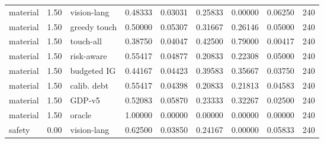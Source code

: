 \documentclass{article}
\begin{document}
\begin{center}
\begin{longtable}{lllllllll}
material & 1.50 & vision-lang & 0.48333 & 0.03031 & 0.25833 & 0.00000 & 0.06250 & 240 \\
material & 1.50 & greedy touch & 0.50000 & 0.05307 & 0.31667 & 0.26146 & 0.05000 & 240 \\
material & 1.50 & touch-all & 0.38750 & 0.04047 & 0.42500 & 0.79000 & 0.00417 & 240 \\
material & 1.50 & risk-aware & 0.55417 & 0.04877 & 0.20833 & 0.22308 & 0.05000 & 240 \\
material & 1.50 & budgeted IG & 0.44167 & 0.04423 & 0.39583 & 0.35667 & 0.03750 & 240 \\
material & 1.50 & calib. debt & 0.55417 & 0.04398 & 0.20833 & 0.21813 & 0.04583 & 240 \\
material & 1.50 & GDP-v5 & 0.52083 & 0.05870 & 0.23333 & 0.32267 & 0.02500 & 240 \\
material & 1.50 & oracle & 1.00000 & 0.00000 & 0.00000 & 0.00000 & 0.00000 & 240 \\
safety & 0.00 & vision-lang & 0.62500 & 0.03850 & 0.24167 & 0.00000 & 0.05833 & 240 \\
\bottomrule
\end{longtable}
\renewcommand{\arraystretch}{1.0}
\end{center}
\end{document}
